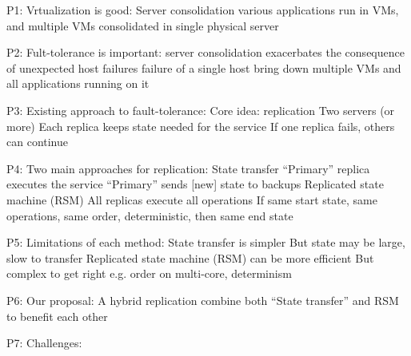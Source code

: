 P1: Vrtualization is good:
Server consolidation
	various applications run in VMs, and multiple VMs consolidated in single physical server

P2: Fult-tolerance is important:
	server consolidation exacerbates the consequence of unexpected host failures
	failure of a single host bring down multiple VMs and all applications running on it

P3: Existing approach to fault-tolerance:
Core idea: replication
	Two servers (or more)
	Each replica keeps state needed for the service
	If one replica fails, others can continue

P4: Two main approaches for replication:
	State transfer
		“Primary” replica executes the service
		“Primary” sends [new] state to backups
	Replicated state machine (RSM)
		All replicas execute all operations
		If same start state, same operations, same order, deterministic, then same end state

P5: Limitations of each method:
	State transfer is simpler
		But state may be large, slow to transfer
	Replicated state machine (RSM) can be more efficient
		But complex to get right
			e.g. order on multi-core, determinism 

P6: Our proposal:
	A hybrid replication
		combine both “State transfer” and RSM to benefit each other

P7: Challenges:
